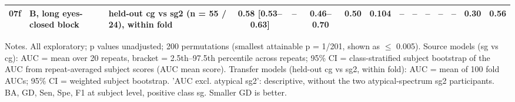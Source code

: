 \begin{table}[htbp]
{\begin{tabular}{lp{2.6cm}p{2.6cm}cccccccccccc}
07f & B, long eyes-closed block & held-out cg vs sg2 (n = 55 / 24), within fold & 0.58 [0.53--0.63] & -- & 0.46--0.70 & 0.50 & 0.104 & -- & -- & -- & -- & -- & 0.30 & 0.56 \\
\bottomrule
\end{tabular}
}
\par\smallskip
\begin{minipage}{\textwidth}\raggedright\scriptsize
Notes. All exploratory; p values unadjusted; 200 permutations (smallest attainable p = 1/201, shown as $\leq$ 0.005). Source models (sg vs cg): AUC = mean over 20 repeats, bracket = 2.5th--97.5th percentile across repeats; 95\% CI = class-stratified subject bootstrap of the AUC from repeat-averaged subject scores (AUC mean score). Transfer models (held-out cg vs sg2, within fold): AUC = mean of 100 fold AUCs; 95\% CI = weighted subject bootstrap. 'AUC excl. atypical sg2': descriptive, without the two atypical-spectrum sg2 participants. BA, GD, Sen, Spe, F1 at subject level, positive class sg. Smaller GD is better.
\end{minipage}
\end{table}
